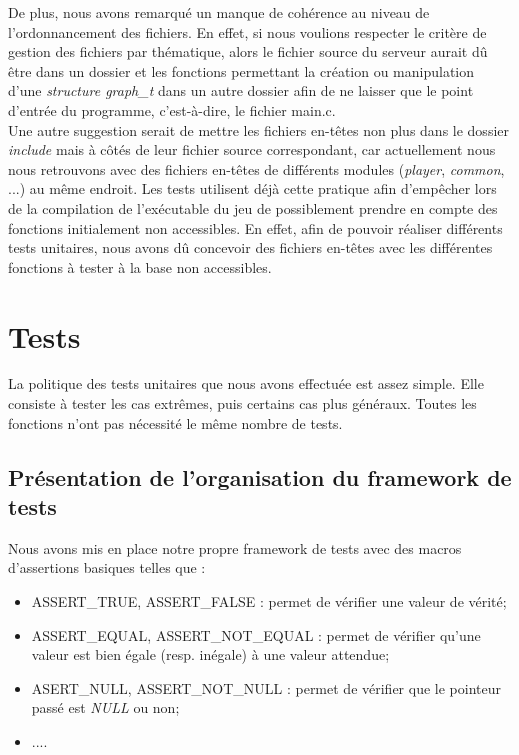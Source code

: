 \documentclass[11pt]{article}
\begin{document}
De plus, nous avons remarqué un manque de cohérence au niveau de l'ordonnancement des fichiers. En effet, si nous voulions respecter le critère de gestion des fichiers par thématique, alors le fichier source du serveur
aurait dû être dans un dossier et les fonctions permettant la création ou manipulation d'une \textit{structure  graph\_t} dans un autre dossier afin de ne laisser que le point d'entrée du programme, c'est-à-dire, le fichier main.c.\\

Une autre suggestion serait de mettre les fichiers en-têtes non plus dans le dossier \textit{include} mais à côtés de leur fichier source correspondant, car actuellement nous nous retrouvons avec des fichiers en-têtes de différents modules (\textit{player}, \textit{common}, ...) au même endroit. Les tests utilisent déjà cette pratique afin d'empêcher lors de la compilation de l'exécutable du jeu de possiblement prendre en compte des fonctions initialement non accessibles. En effet, afin de pouvoir réaliser différents tests unitaires, nous avons dû concevoir des fichiers en-têtes avec les différentes fonctions à tester à la base non accessibles.

\newpage
\section{Tests}

La politique des tests unitaires que nous avons effectuée est assez simple. Elle consiste à tester les cas extrêmes, puis certains cas plus généraux. Toutes les fonctions n'ont pas nécessité le même nombre de tests.

\subsection{Présentation de l'organisation du framework de tests}
Nous avons mis en place notre propre framework de tests avec des macros d'assertions basiques telles que : 
\begin{itemize}
    \item ASSERT\_TRUE, ASSERT\_FALSE : permet de vérifier une valeur de vérité;
    \item ASSERT\_EQUAL, ASSERT\_NOT\_EQUAL : permet de vérifier qu'une valeur est bien égale (resp. inégale) à une valeur attendue;
    \item ASERT\_NULL, ASSERT\_NOT\_NULL : permet de vérifier que le pointeur passé est \textit{NULL} ou non;
    \item ....
\end{itemize}
\end{document}
